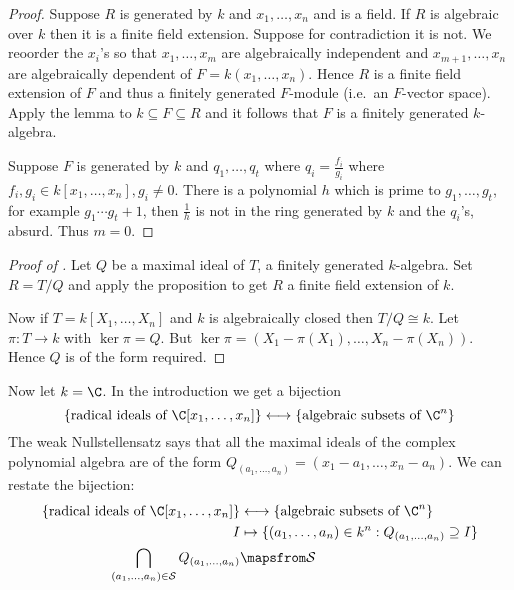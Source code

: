 \documentclass[a4paper]{article}
\begin{document}
\begin{proof}
  Suppose \(R\) is generated by \(k\) and \(x_1, \dots, x_n\) and is a field. If \(R\) is algebraic over \(k\) then it is a finite field extension. Suppose for contradiction it is not. We reoorder the \(x_i\)'s so that \(x_1, \dots, x_m\) are algebraically independent and \(x_{m + 1}, \dots, x_n\) are algebraically dependent of \(F = k(x_1, \dots, x_n)\). Hence \(R\) is a finite field extension of \(F\) and thus a finitely generated \(F\)-module (i.e.\ an \(F\)-vector space). Apply the lemma to \(k \subseteq F \subseteq R\) and it follows that \(F\) is a finitely generated \(k\)-algebra.

  Suppose \(F\) is generated by \(k\) and \(q_1, \dots, q_t\) where \(q_i = \frac{f_i}{g_i}\) where \(f_i, g_i \in k[x_1, \dots, x_n], g_i \neq 0\). There is a polynomial \(h\) which is prime to \(g_1, \dots, g_t\), for example \(g_1 \cdots g_t + 1\), then \(\frac{1}{h}\) is not in the ring generated by \(k\) and the \(q_i\)'s, absurd. Thus \(m = 0\).
\end{proof}

\begin{proof}[Proof of ]
  Let \(Q\) be a maximal ideal of \(T\), a finitely generated \(k\)-algebra. Set \(R = T/Q\) and apply the proposition to get \(R\) a finite field extension of \(k\).

  Now if \(T = k[X_1, \dots, X_n]\) and \(k\) is algebraically closed then \(T/Q \cong k\). Let \(\pi: T \to k\) with \(\ker \pi = Q\). But \(\ker \pi = (X_1 - \pi(X_1), \dots, X_n - \pi(X_n))\). Hence \(Q\) is of the form required.
\end{proof}

Now let \(k = \C\). In the introduction we get a bijection
\[
  \{\text{radical ideals of } \C[x_1, \dots, x_n]\} \longleftrightarrow \{\text{algebraic subsets of } \C^n\}
\]
The weak Nullstellensatz says that all the maximal ideals of the complex polynomial algebra are of the form \(Q_{(a_1, \dots, a_n)} = (x_1 - a_1, \dots, x_n - a_n)\). We can restate the bijection:
\begin{align*}
  \{\text{radical ideals of } \C[x_1, \dots, x_n]\} &\longleftrightarrow \{\text{algebraic subsets of } \C^n\} \\
  I &\mapsto \{(a_1, \dots, a_n) \in k^n: Q_{(a_1, \dots, a_n)} \supseteq I\} \\
  \bigcap_{(a_1, \dots, a_n) \in \mathcal S} Q_{(a_1, \dots, a_n)} &\mapsfrom \mathcal S
\end{align*}
\end{document}
